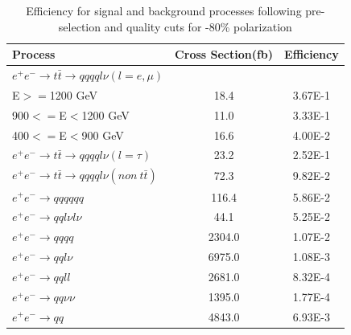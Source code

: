 \begin{table}
  \centering
  \begin{tabular}{l | c | c }
    \toprule
    Process     & Cross Section(fb) & Efficiency  \\
    \midrule
    $e^+e^-\rightarrow t\bar{t} \rightarrow qqqql\nu (l=e,\mu)$&  &  \\
    E$>=$1200 GeV & 18.4 & 3.67E-1 \\
    900$<=$E$<$1200 GeV & 11.0 & 3.33E-1 \\
    400$<=$E$<$900 GeV & 16.6 & 4.00E-2 \\
    \midrule
    $e^+e^-\rightarrow t\bar{t} \rightarrow qqqql\nu (l=\tau)$& 23.2 & 2.52E-1 \\
    \midrule
    $e^+e^-\rightarrow t\bar{t} \rightarrow qqqql\nu (non ~ t\bar{t})$& 72.3 & 9.82E-2\\
    \midrule
    $e^+e^-\rightarrow qqqqqq$ & 116.4 & 5.86E-2  \\
    \midrule
    $e^+e^-\rightarrow qql\nu l\nu$ & 44.1 & 5.25E-2 \\
    \midrule
    $e^+e^-\rightarrow qqqq$ & 2304.0 & 1.07E-2 \\
    \midrule
    $e^+e^-\rightarrow qql\nu$ & 6975.0 & 1.08E-3 \\
    \midrule
    $e^+e^-\rightarrow qqll$ & 2681.0 & 8.32E-4 \\
    \midrule
    $e^+e^-\rightarrow qq\nu\nu$ & 1395.0 & 1.77E-4 \\
    \midrule
    $e^+e^-\rightarrow qq$ & 4843.0 & 6.93E-3\\
    \bottomrule
  \end{tabular}
  \caption{Efficiency for signal and background processes following pre-selection and quality cuts for -80\% polarization}
  \label{table:topqualneg}
\end{table}

